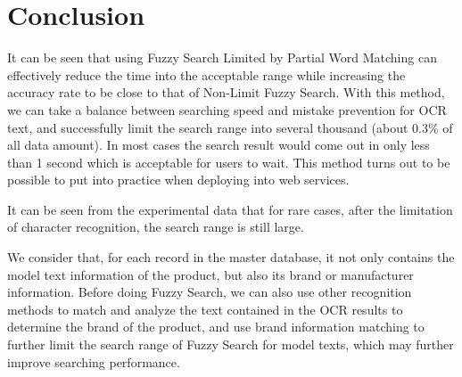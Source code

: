 \documentclass[technicalreport]{ieicej}
\begin{document}
        
        
    \section{Conclusion}
    \label{sec:conclusion}
        It can be seen that using Fuzzy Search Limited by Partial Word Matching can effectively reduce the time into the acceptable range while increasing the accuracy rate to be close to that of Non-Limit Fuzzy Search. With this method, we can take a balance between searching speed and mistake prevention for OCR text, and successfully limit the search range into several thousand (about 0.3\% of all data amount). In most cases the search result would come out in only less than 1 second which is acceptable for users to wait. This method turns out to be possible to put into practice when deploying into web services.
        
        It can be seen from the experimental data that for rare cases, after the limitation of character recognition, the search range is still large.
        
        We consider that, for each record in the master database, it not only contains the model text information of the product, but also its brand or manufacturer information. Before doing Fuzzy Search, we can also use other recognition methods to match and analyze the text contained in the OCR results to determine the brand of the product, and use brand information matching to further limit the search range of Fuzzy Search for model texts, which may further improve searching performance.
        
\end{document}
